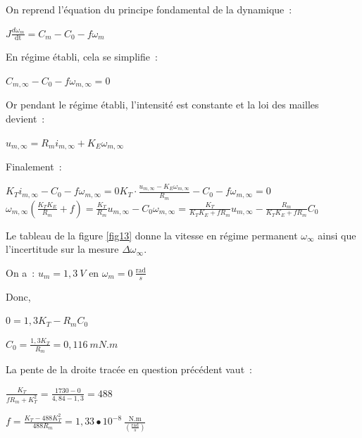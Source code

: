 \ifprof
\begin{corrige}
On reprend l'équation du principe fondamental de la dynamique~:


\(J\frac{d\omega_{m}}{\text{dt}} = C_{m} - C_{0} - f\omega_{m}\)

En régime établi, cela se simplifie~:

\(C_{m,\infty} - C_{0} - f\omega_{m,\infty} = 0\)

Or pendant le régime établi, l'intensité est constante et la loi des
mailles devient~:

\(u_{m,\infty} = R_{m}i_{m,\infty} + K_{E}\omega_{m,\infty}\)

Finalement~:

\({K_{T}i_{m,\infty} - C_{0} - f\omega_{m,\infty} = 0}\)\({K_{T} \cdot \frac{u_{m,\infty} - K_{E}\omega_{m,\infty}}{R_{m}} - C_{0} - f\omega_{m,\infty} = 0}\)\({\omega_{m,\infty}\left( \frac{K_{T}K_{E}}{R_{m}} + f \right) = \frac{K_{T}}{R_{m}}u_{m,\infty} - C_{0}}\)\({\omega_{m,\infty} = \frac{K_{T}}{K_{T}K_{E} + fR_{m}}u_{m,\infty} - \frac{R_{m}}{K_{T}K_{E} + fR_{m}}C_{0}}\)

\end{corrige}
\else
\fi


Le tableau de la figure \ref{fig13} donne la vitesse en régime permanent $\omega_{\infty}$ ainsi que l'incertitude sur la mesure $\Delta \omega_{\infty}$.

\ifprof
\begin{corrige}
\end{corrige}
\else
\fi


\ifprof
\begin{corrige}
On a~: \(u_{m} = 1,3\ V\) en \(\omega_{m} = 0\ \frac{\text{rad}}{s}\)
 
Donc,

\(0 = 1,3K_{T} - R_{m}C_{0}\)

\(C_{0} = \frac{1,3K_{T}}{R_{m}} = 0,116\ mN.m\)

La pente de la droite tracée en question précédent vaut~:

\(\frac{K_{T}}{fR_{m} + K_{T}^{2}} = \frac{1730 - 0}{4,84 - 1,3} = 488\)

\(f = \frac{K_{T} - 488K_{T}^{2}}{488R_{m}} = 1,33 \bullet 10^{- 8}\ \frac{\text{N.m}}{\left( \frac{\text{rad}}{s} \right)}\)
\end{corrige}
\else
\fi


